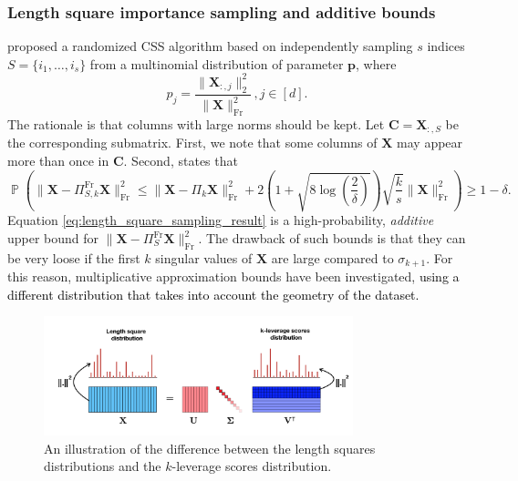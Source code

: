 \documentclass[twoside,11pt]{book}
\newcommand{\rev}[1]{\textcolor{black}{#1}}
\numberwithin{theorem}{chapter}
\numberwithin{definition}{chapter}
\numberwithin{proposition}{chapter}
\numberwithin{corollary}{chapter}
\numberwithin{example}{chapter}
\numberwithin{lemma}{chapter}
\numberwithin{assumption}{chapter}
\numberwithin{equation}{chapter}
\numberwithin{figure}{chapter}
\DeclareMathOperator{\Fr}{\mathrm{Fr}}
\DeclareMathOperator{\Prb}{\mathbb{P}}
\begin{document}
\subsubsection{Length square importance sampling and additive bounds}\label{subsec:length_square_sampling}
\cite*{DFKVV04} proposed a randomized CSS algorithm based on independently sampling $s$ indices $S=\{i_1,\dots,i_s\}$ from a multinomial distribution of parameter $\bm{p}$, where
\begin{equation}
 p_{j} = \frac{\|\bm{X}_{:,j}\|_{2}^{2}}{\|\bm{X}\|_{\Fr}^{2}} \, , j \in [d].
\end{equation}
The rationale is that columns with large norms should be kept. Let $\bm{C} = \bm{X}_{:,S}$ be the corresponding submatrix. First, we note that some columns of $\bm{X}$ may appear more than once in $\bm{C}$. Second, \cite[Theorem 3]{DFKVV04} states that
\begin{equation}\label{eq:length_square_sampling_result}
    \Prb \left( \| \bm{X} - \Pi_{S,k}^{\Fr}\bm{X}\|_{\Fr}^{2} \leq \|\bm{X} - \Pi_{k}\bm{X}\|_{\Fr}^{2} + 2\left( 1+\sqrt{8\log\left(\frac{2}{\delta}\right)} \right) \sqrt{\frac{k}{s}}\| \bm{X}\|_{\Fr}^{2} \right) \geq 1-\delta.
\end{equation}
Equation \eqref{eq:length_square_sampling_result} is a high-probability, \emph{additive} upper bound for $\| \bm{X} - \Pi_{S}^{\Fr}\bm{X}\|_{\Fr}^{2}$. The drawback of such bounds is that they can be very loose if the first $k$ singular values of $\bm{X}$ are large compared to $\sigma_{k+1}$. For this reason, multiplicative approximation bounds have been investigated, \rev{using a different distribution that takes into account the geometry of the dataset.}
\begin{figure}
\centering
\includegraphics[width= 0.8\textwidth]{img/cssp/colorful_svd.png}
\caption{An illustration of the difference between the length squares distributions and the $k$-leverage scores distribution. \label{fig:difference_between_klv_lentgh}}
\end{figure}
\end{document}
